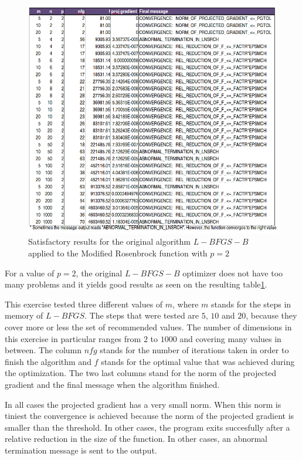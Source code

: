 \begin{figure}
\begin{center}
\includegraphics[scale=0.58]{Figures/Nocedalp2.png}
\caption[Modified Rosenbrock with $p = 2$]{Satisfactory results for the original algorithm $L-BFGS-B$ applied to the Modified Rosenbrock function with $p = 2$}
\label{pequal2}
\end{center}
\end{figure}


For a value of $p = 2$, the original $L-BFGS-B$ optimizer does not have too many problems and it yields good results as seen on the resulting table\ref{pequal2}.

This exercise tested three different values of $m$, where $m$ stands for the steps in memory of $L-BFGS$. The steps that were tested are $5$, $10$ and $20$, because they cover more or less the set of recommended values. The number of dimensions in this exercise in particular ranges from $2$ to $1000$ and covering many values in between. The column $nfg$ stands for the number of iterations taken in order to finish the algorithm and $f$ stands for the optimal value that was achieved during the optimization. The two last columns stand for the norm of the projected gradient and the final message when the algorithm finished.

In all cases the projected gradient has a very small norm. When this norm is tiniest the convergence is achieved because the norm of the projected gradient is smaller than the threshold. In other cases, the program exits succesfully after a relative reduction in the size of the function. In other cases, an abnormal termination message is sent to the output.

